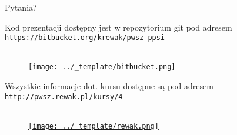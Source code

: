 \appendix

\begin{frame}[standout]
	Pytania?
\end{frame}

\begin{frame}{}

	Kod prezentacji dostępny jest w repozytorium git pod adresem \texttt{https://bitbucket.org/krewak/pwsz-ppsi} \\ \ \\

	\begin{figure}
		\centering
		\href{https://bitbucket.org/krewak/pwsz-ppsi}{
			\texttt{[image: ../\_template/bitbucket.png]}
		}
	\end{figure}
	
	Wszystkie informacje dot. kursu dostępne są pod adresem \texttt{http://pwsz.rewak.pl/kursy/4} \\ \ \\

	\begin{figure}
		\centering
		\href{http://pwsz.rewak.pl/kursy/3}{
			\texttt{[image: ../\_template/rewak.png]}
		}
	\end{figure}

\end{frame}


